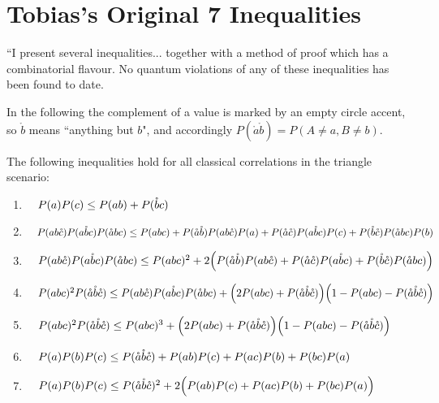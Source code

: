 \onecolumngrid
\appendix
\renewcommand{\theequation}{A-\arabic{equation}}
\setcounter{equation}{0}


\renewcommand{\labelenumi}{(\alph{enumi})}
\renewcommand{\theenumi}{(\alph{enumi})}
\renewcommand{\labelitemi}{$\circ$}



\section{Tobias's Original 7 Inequalities}

``I present several inequalities... together with a method of proof which has a combinatorial flavour. No quantum violations of any of these inequalities has been found to date.

In the following the complement of a value is marked by an empty circle accent, so $\mathring{b}$ means ``anything but $b$", and accordingly $P(\mathring{a}\mathring{b})=P(A\mathopen{\neq}a,B\mathopen{\neq}b)$. 
\begin{theorem}
The following inequalities hold for all classical correlations in the triangle scenario:
\begin{enumerate}
\item
\(\quad
P(a) P(c)  \leq  P(a b) + P(\nb c)
\)
\item
\(\quad
P(a b\nc) P(a \nb c) P(\na b c) \leq P(a b c) + P(\na \nb) P(a b \nc) P(a) + P(\na\nc) P(a\nb c) P(c)  + P(\nb \nc) P(\na b c) P(b)
\)
\item 
\(\quad
P(a b\nc) P(a \nb c) P(\na b c) \leq P(a b c)^2 + 2\parens*{P(\na \nb) P(a b \nc) + P(\na\nc) P(a\nb c)  + P(\nb \nc) P(\na b c)}
\)
\item
\(\quad
P(a b c)^2 P(\na\nb\nc)  \leq  P(a b \nc) P(a \nb c) P(\na b c) + \parens*{2 P(a b c) + P(\na\nb\nc)} \parens*{1 - P(a b c) - P(\na\nb\nc)}
\)
\item
\(\quad
P(a b c)^2 P(\na\nb\nc)  \leq  P(a b c)^3 + \parens*{2 P(a b c) + P(\na\nb\nc)} \parens*{1 - P(a b c) - P(\na\nb\nc)}
\)
\item
\(\quad
P(a) P(b) P(c) \leq  P(\na\nb\nc) + P(a b) P(c) + P(a c) P(b) + P(b c) P(a)
\)
\item
\(\quad
P(a) P(b) P(c) \leq  P(\na\nb\nc)^2 +2\parens[\Big]{ P(a b) P(c) + P(a c) P(b) + P(b c) P(a) }
\)
\end{enumerate}
\end{theorem}

